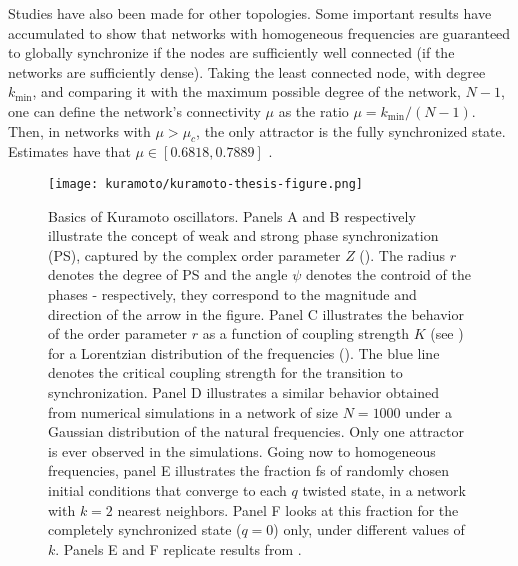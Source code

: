 Studies have also been made for other topologies. Some important results have accumulated to show that networks with homogeneous frequencies are guaranteed to globally synchronize if the nodes are sufficiently well connected (if the networks are sufficiently dense). Taking the least connected node, with degree $k_\mathrm{min}$, and comparing it with the maximum possible degree of the network, $N-1$, one can define the network's connectivity $\mu$ as the ratio $\mu = k_\mathrm{min}/(N-1)$. Then, in networks with $\mu > \mu_c$, the only attractor is the fully synchronized state. Estimates have that $\mu \in [0.6818, 0.7889]$ \cite{taylor2012there, townsend2020dense}. 
%
\begin{figure}
    \texttt{[image: kuramoto/kuramoto-thesis-figure.png]}
    \caption{Basics of Kuramoto oscillators. Panels A and B respectively illustrate the concept of weak and strong phase synchronization (PS), captured by the complex order parameter $Z$ (). The radius $r$ denotes the degree of PS and the angle $\psi$ denotes the controid of the phases - respectively, they correspond to the magnitude and direction of the arrow in the figure. Panel C illustrates the behavior of the order parameter $r$ as a function of coupling strength $K$ (see ) for a Lorentzian distribution of the frequencies (). The blue line denotes the critical coupling strength for the transition to synchronization. Panel D illustrates a similar behavior obtained from numerical simulations in a network of size $N=1000$ under a Gaussian distribution of the natural frequencies. Only one attractor is ever observed in the simulations. Going now to homogeneous frequencies, panel E illustrates the fraction fs of randomly chosen initial conditions that converge to each $q$ twisted state, in a network with $k=2$ nearest neighbors. Panel F looks at this fraction for the completely synchronized state ($q=0$) only, under different values of $k$. Panels E and F replicate results from \cite{wiley2006the}. }
    \label{fig:method:kuramoto}
\end{figure}

